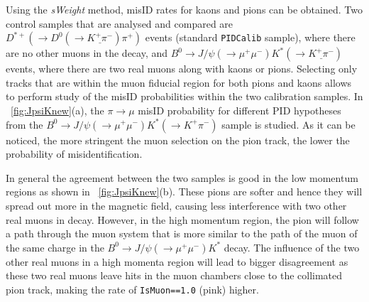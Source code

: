 Using the \textit{sWeight} method, misID rates for kaons and pions can be obtained. Two control samples that are analysed and compared are $D^{*+}(\rightarrow D^{0}(\rightarrow \underline{K^{+} \pi^{-}}) \pi^{+})$ events (standard \texttt{PIDCalib} sample), where there are no other muons in the decay, and $B^{0} \rightarrow J/\psi(\rightarrow \mu^{+} \mu^{-}) K^{*}(\rightarrow \underline{K^{+}\pi^{-}})$ events, where there are two real muons along with kaons or pions. Selecting only tracks that are within the muon fiducial region for both pions and kaons allows to perform study of the misID probabilities within the two calibration samples. In ~\autoref{fig:JpsiKnew}(a), the $\pi \rightarrow \mu$ misID probability for different \gls{PID} hypotheses from the $B^{0} \rightarrow J/\psi(\rightarrow \mu^{+} \mu^{-}) K^{*}(\rightarrow K^{+}\pi^{-})$ sample is studied. As it can be noticed, the more stringent the muon selection on the pion track, the lower the probability of misidentification.

In general the agreement between the two samples is good in the low momentum regions as shown in ~\autoref{fig:JpsiKnew}(b). These pions are softer and hence they will spread out more in the magnetic field, causing less interference with two other real muons in decay. However, in the high momentum region, the pion will follow a path through the muon system that is more similar to the path of the muon of the same charge in the $B^{0} \rightarrow J/\psi(\rightarrow \mu^{+} \mu^{-}) K^{*}$ decay. The influence of the two other real muons in a high momenta region will lead to bigger disagreement as these two real muons leave hits in the muon chambers close to the collimated pion track, making the rate of \texttt{IsMuon==1.0} (pink) higher. 





